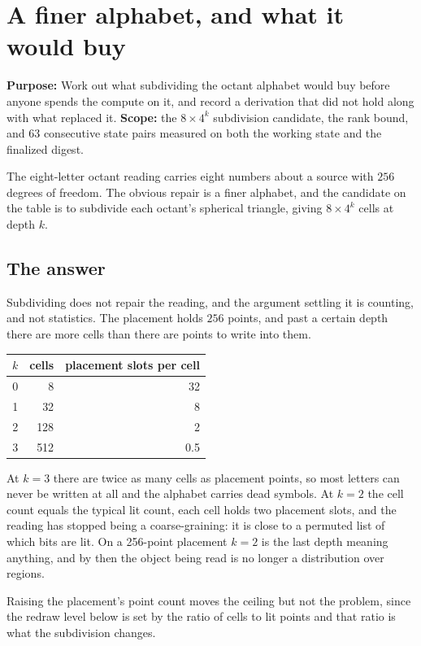 \chapter{A finer alphabet, and what it would buy}

\textbf{Purpose:} Work out what subdividing the octant alphabet would buy before anyone spends the compute on it, and record a derivation that did not hold along with what replaced it. \textbf{Scope:} the \(8 \times 4^k\) subdivision candidate, the rank bound, and 63 consecutive state pairs measured on both the working state and the finalized digest.

The eight-letter octant reading carries eight numbers about a source with \(256\) degrees of freedom. The obvious repair is a finer alphabet, and the candidate on the table is to subdivide each octant's spherical triangle, giving \(8 \times 4^k\) cells at depth \(k\).

\section{The answer}

Subdividing does not repair the reading, and the argument settling it is counting, and not statistics. The placement holds \(256\) points, and past a certain depth there are more cells than there are points to write into them.

\begin{center}
\begin{tabular}{@{}rrr@{}}
\toprule
\(k\) & cells & placement slots per cell \\
\midrule
0 & 8 & 32 \\
1 & 32 & 8 \\
2 & 128 & 2 \\
3 & 512 & 0.5 \\
\bottomrule
\end{tabular}
\end{center}

At \(k = 3\) there are twice as many cells as placement points, so most letters can never be written at all and the alphabet carries dead symbols. At \(k = 2\) the cell count equals the typical lit count, each cell holds two placement slots, and the reading has stopped being a coarse-graining: it is close to a permuted list of which bits are lit. On a 256-point placement \(k = 2\) is the last depth meaning anything, and by then the object being read is no longer a distribution over regions.

Raising the placement's point count moves the ceiling but not the problem, since the redraw level below is set by the ratio of cells to lit points and that ratio is what the subdivision changes.

